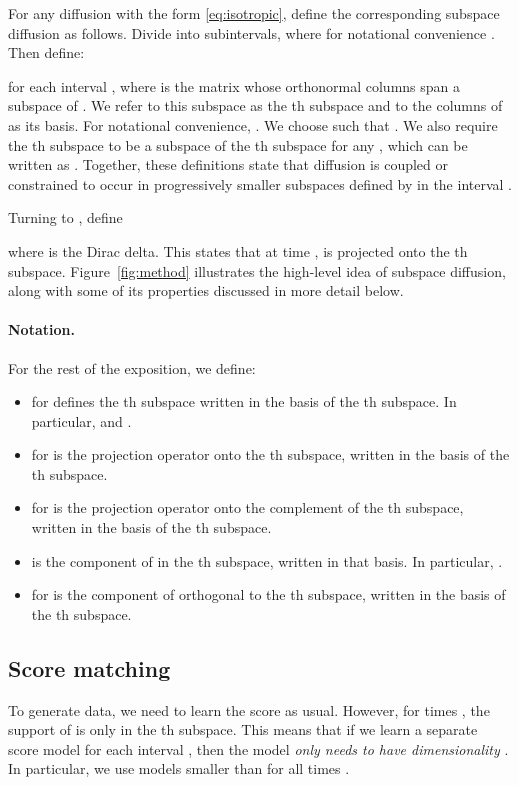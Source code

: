 \documentclass{article}
\begin{document}
For any diffusion with the form \eqref{eq:isotropic}, define the corresponding subspace diffusion as follows. Divide  into  subintervals,  where for notational convenience . Then define:

for each interval , where  is the matrix whose  orthonormal columns span a subspace of . We refer to this subspace as the th subspace and to the columns of  as its basis. For notational convenience, . We choose  such that . We also require the th subspace to be a subspace of the th subspace for any , which can be written as . Together, these definitions state that diffusion is coupled or constrained to occur in progressively smaller subspaces defined by  in the interval .

Turning to , define 

where  is the Dirac delta. This states that at time ,  is projected onto the th subspace. Figure~\ref{fig:method} illustrates the high-level idea of subspace diffusion, along with some of its properties discussed in more detail below.

\paragraph{\textbf{Notation.}} For the rest of the exposition, we define:
\begin{itemize}
    \item  for  defines the th subspace written in the basis of the th subspace. In particular,  and .
    \item  for  is the projection operator onto the th subspace, written in the basis of the th subspace.
    \item  for  is the projection operator onto the complement of the th subspace, written in the basis of the th subspace.
    \item  is the component of  in the th subspace, written in that basis. In particular, .
    \item  for  is the component of  orthogonal to the th subspace, written in the basis of the th subspace.
\end{itemize}

\subsection{Score matching} \label{sec:score}
To generate data, we need to learn the score  as usual. However, for times , the support of  is only in the th subspace. This means that if we learn a separate score model  for each interval , then the model  \emph{only needs to have dimensionality} . In particular, we use models smaller than  for all times .
\end{document}
